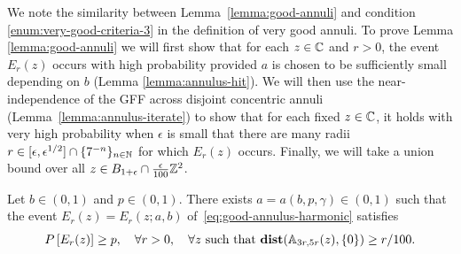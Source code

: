 \documentclass[12pt]{amsart}
\numberwithin{equation}{section}
\begin{document}
	We note the similarity between Lemma~\ref{lemma:good-annuli} and condition \ref{enum:very-good-criteria-3} in the definition of very good annuli.
	To prove Lemma \ref{lemma:good-annuli} we will first show that for each $z \in \mathbb{C}$ and $r > 0$, the event $E_r(z)$ occurs 
	with high probability provided $a$ is chosen to be sufficiently small depending on $b$ (Lemma \ref{lemma:annulus-hit}).
	We will then use the near-independence of the GFF across disjoint concentric annuli (Lemma~\ref{lemma:annulus-iterate}) 
	to show that for each fixed $z \in \mathbb{C}$, it holds with very high probability when $\epsilon$ is small 
	that there are many radii $r \in [\epsilon, \epsilon^{1/2}] \cap \{7^{-n}\}_{n \in \mathbb{N}}$ for which $E_r(z)$ occurs. 
	Finally, we will take a union bound over all $z \in B_{1 + \epsilon} \cap \frac{\epsilon}{100} \mathbb{Z}^2$. 
	
	
	\begin{lemma} \label{lemma:annulus-hit}
		Let $b \in (0,1)$ and $p \in (0,1)$. There exists $a = a(b,p,\gamma) \in (0,1)$ such that the event $E_r(z) = E_r(z;a,b)$ of~\eqref{eq:good-annulus-harmonic} satisfies 
		\[
		P\left[ E_r(z) \right] \geq p ,\quad \forall r > 0,\quad \forall z \mbox{ such that $\mathop{\bf dist{}}(\mathbb{A}_{3 r, 5 r}(z), \{0\}) \geq r/100$}.
		\]
	\end{lemma}
	
\end{document}
